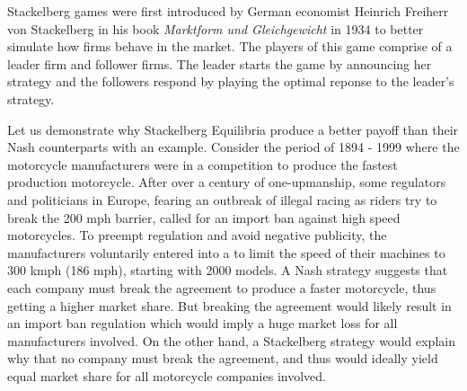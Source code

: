 
Stackelberg games were first introduced by German economist Heinrich Freiherr von Stackelberg in his book \textit{Marktform und Gleichgewicht} in 1934 \cite{S34} to better simulate how firms behave in the market. The players of this game comprise of a leader firm and follower firms. The leader starts the game by announcing her strategy and the followers respond by playing the optimal reponse to the leader's strategy.

Let us demonstrate why Stackelberg Equilibria produce a better payoff than their Nash counterparts with an example. Consider the period of 1894 - 1999 where the motorcycle manufacturers were in a competition to produce the fastest production motorcycle. After over a century of one-upmanship, some regulators and politicians in Europe, fearing an outbreak of illegal racing as riders try to break the 200 mph barrier, called for an import ban against high speed motorcycles. To preempt regulation and avoid negative publicity, the manufacturers voluntarily entered into a  to limit the speed of their machines to 300 kmph (186 mph), starting with 2000 models. A Nash strategy suggests that each company must break the agreement to produce a faster motorcycle, thus getting a higher market share. But breaking the agreement would likely result in an import ban regulation which would imply a huge market loss for all manufacturers involved. On the other hand, a Stackelberg strategy would explain why that no company must break the agreement, and thus would ideally yield equal market share for all motorcycle companies involved.\cite{WIKI00}

